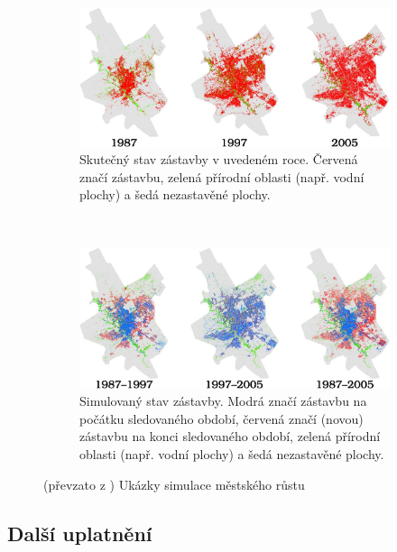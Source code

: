 \documentclass[a4paper,10pt]{article}
\begin{document}
\begin{figure}[]
    \begin{subfigure}[t]{\textwidth} \centering
      \includegraphics[width=\textwidth]{urban-growt-city-1}
      \caption{Skutečný stav zástavby v uvedeném roce. Červená značí zástavbu, zelená přírodní oblasti (např. vodní plochy) a šedá nezastavěné plochy.} 
    \end{subfigure}
    \\
    \begin{subfigure}[t]{\textwidth} \centering
      \includegraphics[width=\textwidth]{urban-growt-city-2}
      \caption{Simulovaný stav zástavby. Modrá značí zástavbu na počátku sledovaného období, červená značí (novou) zástavbu na konci sledovaného období, zelená přírodní oblasti (např. vodní plochy) a šedá nezastavěné plochy.} 
    \end{subfigure}

    \caption[Ukázky simulace městského růstu]{(převzato z \cite{Ahm+-CalFuzCelAutModUrbDynSauAr}) Ukázky simulace městského růstu} \label{img:UrbGroProSample}
\end{figure}

\subsection{Další uplatnění}
\end{document}
